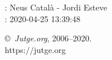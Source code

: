 \documentclass[11pt]{article}
\begin{document}
    \newcommand{\SampleTwoCol}{\SampleTwoColInputOutput{sample1}{1}\SampleTwoColInputOutput{sample2}{2}}
    \newcommand{\SampleOneCol}{\SampleOneColInputOutput{sample1}{1}\SampleOneColInputOutput{sample2}{2}}

    \ProblemInformation
    \Author: Neus Català - Jordi Esteve\\    
    \Generation: 2020-04-25 13:39:48

    \bigskip

    \copyright\ \emph{Jutge.org}, 2006--2020. \\
    https:$/\!\!/$jutge.org
\end{document}
